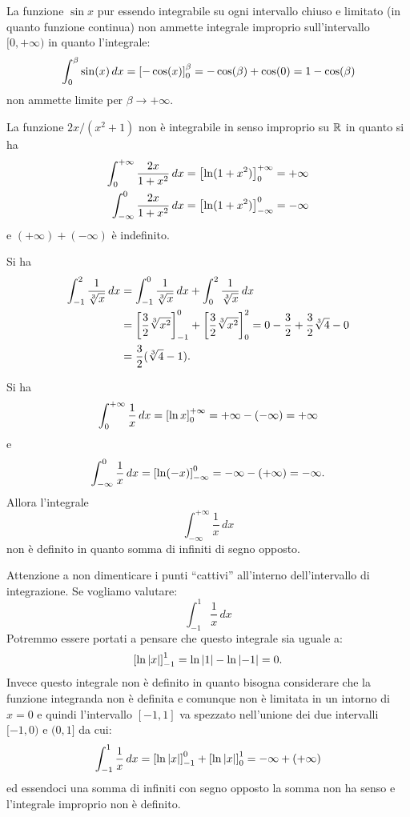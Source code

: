 \begin{example}
La funzione $\sin x$ pur essendo integrabile su ogni intervallo chiuso
e limitato (in quanto funzione continua) non ammette integrale
improprio sull'intervallo $[0,+\infty)$ in quanto l'integrale:
\[
  \int_0^\beta \sin(x)\, dx
  = {\left[ -\cos(x) \right]}_0^\beta
  = -\cos(\beta)+\cos(0) = 1-\cos(\beta)
\]
non ammette limite per $\beta\to +\infty$.
\end{example}

\begin{example}
La funzione $2x/(x^2+1)$ non è integrabile in senso improprio su ${\mathbb R}$ in quanto si ha
\begin{align*}
\int_{0}^{+\infty} \frac {2x} {1+x^2}\, dx
 &= {\left[ \ln (1+x^2) \right]}_0^{+\infty} = +\infty \\
\int_{-\infty}^0 \frac{2x}{1+x^2}\, dx
 &= {\left[ \ln(1+x^2) \right]}_{-\infty}^0 = -\infty
\end{align*}
e $(+\infty)+ (-\infty)$ è indefinito.
\end{example}

\begin{example}
Si ha
\begin{align*}
  \int_{-1}^2 \frac{1}{\sqrt[3]{x}}\, dx
  &= \int_{-1}^0 \frac{1}{\sqrt[3] {x}}\, dx
   + \int_{0}^2 \frac{1}{\sqrt[3] x}\, dx \\
  &= {\left[ \frac 3 2 \sqrt[3] {x^2} \right]}_{-1}^0  + {\left[ \frac 3 2 \sqrt[3] {x^2} \right]}_0^2
  = 0 - \frac 3 2 + \frac 3 2 \sqrt[3]{4} - 0 \\
  &= \frac 3 2 (\sqrt[3] 4-1).
\end{align*}
\end{example}

\begin{example}
Si ha
\[
  \int_0^{+\infty} \frac{1}{x}\, dx
  = {\left[ \ln x \right]}_0^{+\infty}
  = +\infty - (-\infty) = +\infty
\]
e
\[
  \int_{-\infty}^{0} \frac{1}{x}\, dx
  = {\left[ \ln(-x) \right]}_{-\infty}^{0}
  = -\infty - (+\infty) = -\infty.
\]
Allora l'integrale
\[
  \int_{-\infty}^{+\infty} \frac{1}{x}\, dx
\]
non è definito in quanto somma di infiniti di segno opposto.
\end{example}

\begin{remark}
Attenzione a non dimenticare i punti ``cattivi'' all'interno dell'intervallo
di integrazione. Se vogliamo valutare:
\[
  \int_{-1}^1 \frac{1}{x}\, dx
\]
Potremmo essere portati a pensare che questo integrale sia uguale a:
\[
 {\left[ \ln {\left|x\right|} \right]}_{-1}^1 = \ln {\left|1\right|} - \ln {\left|-1\right|} = 0.
\]
Invece questo integrale non è definito in quanto bisogna considerare
che la funzione integranda non è definita e comunque non è limitata in un
intorno di $x=0$ e quindi l'intervallo $[-1,1]$ va spezzato nell'unione
dei due intervalli $[-1,0)$ e $(0,1]$ da cui:
\[
  \int_{-1}^1 \frac{1}{x}\, dx = {\left[ \ln {\left|x\right|} \right]}_{-1}^0 + {\left[ \ln{\left|x\right|} \right]}_0^{1}
   = -\infty + (+\infty)
\]
ed essendoci una somma di infiniti con segno opposto la somma non ha senso
e l'integrale improprio non è definito.
\end{remark}

